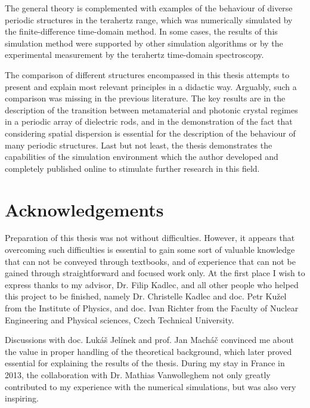 The general theory is complemented with examples of the behaviour of diverse periodic structures in the terahertz range, which was numerically simulated by the finite-difference time-domain method. In some cases, the results of this simulation method were supported by other simulation algorithms or by the experimental measurement by the terahertz time-domain spectroscopy. 

The comparison of different structures encompassed in this thesis attempts to present and explain most relevant principles in a didactic way. Arguably, such a comparison was missing in the previous literature.
The key results are in the description of the transition between metamaterial and photonic crystal regimes in a periodic array of dielectric rods, and in the demonstration of the fact that considering spatial dispersion is essential for the description of the behaviour of many periodic structures.
Last but not least, the thesis demonstrates the capabilities of the simulation environment which the author developed and completely published online to stimulate further research in this field. 


\thispagestyle{empty} \newpage
\chapter*{Acknowledgements}
Preparation of this thesis was not without difficulties. However, it appears that overcoming such difficulties is essential to gain some sort of valuable knowledge that can not be conveyed through textbooks, and of experience that can not be gained through straightforward and focused work only.  At the first place I wish to express thanks to my advisor, Dr. Filip Kadlec, and all other people who helped this project to be finished, namely Dr. Christelle Kadlec and doc. Petr Ku\v{z}el  from the Institute of Physics, and doc. Ivan Richter from the Faculty of Nuclear Engineering and Physical sciences, Czech Technical University. 

Discussions with doc. Lukáš Jelínek and prof. Jan Macháč convinced me about the value in proper handling of the theoretical background, which later proved essential for explaining the results of the thesis. During my stay in France in 2013, the collaboration with Dr. Mathias Vanwolleghem not only greatly contributed to my experience with the numerical simulations, but was also very inspiring. 

